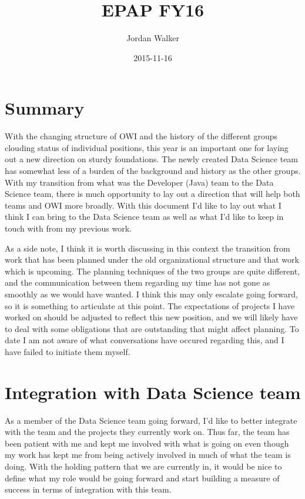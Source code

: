 \documentclass{article}
\title{EPAP FY16}
\author{Jordan Walker}
\date{2015-11-16}
\begin{document}
\maketitle

\section{Summary}

With the changing structure of OWI and the history of the different groups clouding status of individual positions, this year is an important one for laying out a new direction on sturdy foundations.
The newly created Data Science team has somewhat less of a burden of the background and history as the other groups.
With my transition from what was the Developer (Java) team to the Data Science team, there is much opportunity to lay out a direction that will help both teams and OWI more broadly.
With this document I'd like to lay out what I think I can bring to the Data Science team as well as what I'd like to keep in touch with from my previous work.

As a side note, I think it is worth discussing in this context the transition from work that has been planned under the old organizational structure and that work which is upcoming.
The planning techniques of the two groups are quite different, and the communication between them regarding my time has not gone as smoothly as we would have wanted.
I think this may only escalate going forward, so it is something to articulate at this point.
The expectations of projects I have worked on should be adjusted to reflect this new position, and we will likely have to deal with some obligations that are outstanding that might affect planning.
To date I am not aware of what conversations have occured regarding this, and I have failed to initiate them myself.

\section{Integration with Data Science team}

As a member of the Data Science team going forward, I'd like to better integrate with the team and the projects they currently work on.
Thus far, the team has been patient with me and kept me involved with what is going on even though my work has kept me from being actively involved in much of what the team is doing.
With the holding pattern that we are currently in, it would be nice to define what my role would be going forward and start building a measure of success in terms of integration with this team.
\end{document}
